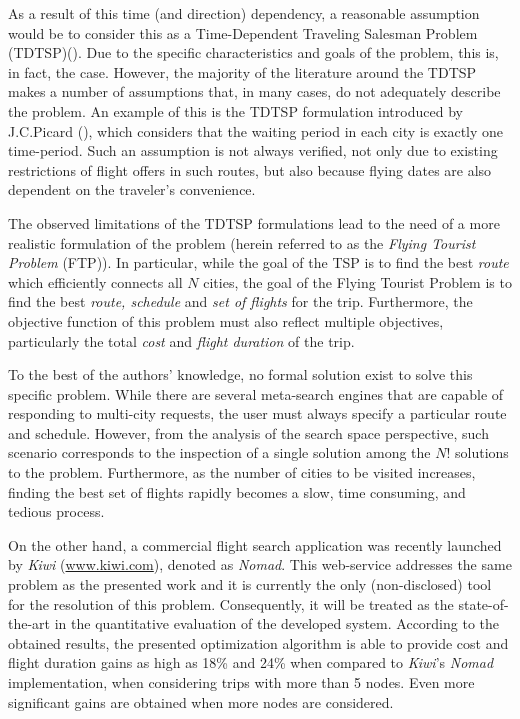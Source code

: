 \documentclass[onecolumn]{elsarticle}
\begin{document}
As a result of this time (and direction) dependency, a reasonable assumption would be to consider this as a Time-Dependent Traveling Salesman Problem (TDTSP)(\cite{tdtsp_fox_2}). Due to the specific characteristics and goals of the problem, this is, in fact, the case. However, the majority of the literature around the TDTSP makes a number of assumptions that, in many cases, do not adequately describe the problem. An example of this is the TDTSP formulation introduced by J.C.Picard (\cite{tdtsp_picard}), which considers that the waiting period in each city is exactly one time-period. Such an assumption is not always verified, not only due to existing restrictions of flight offers in such routes, but also because flying dates are also dependent on the traveler's convenience.

The observed limitations of the TDTSP formulations lead to the need of a more realistic formulation of the problem (herein referred to as the \textit{Flying Tourist Problem} (FTP)). In particular, while the goal of the TSP is to find the best \textit{route} which efficiently connects all $N$ cities, the goal of the Flying Tourist Problem is to find the best \textit{route, schedule} and \textit{set of flights} for the trip. Furthermore, the objective function of this problem must also reflect multiple objectives, particularly the total \textit{cost} and \textit{flight duration} of the trip.

To the best of the authors' knowledge, no formal solution exist to solve this specific problem. While there are several meta-search engines that are capable of responding to multi-city requests, the user must always specify a particular route and schedule. However, from the analysis of the search space perspective, such scenario corresponds to the inspection of a single solution among the $N!$ solutions to the problem. Furthermore, as the number of cities to be visited increases, finding the best set of flights rapidly becomes a slow, time consuming, and tedious process.

On the other hand, a commercial flight search application was recently launched by \textit{Kiwi} (\url{www.kiwi.com}), denoted as \textit{Nomad}. This web-service addresses the same problem as the presented work and it is currently the only (non-disclosed) tool for the resolution of this problem. Consequently, it will be treated as the state-of-the-art in the quantitative evaluation of the developed system. According to the obtained results, the presented optimization algorithm is able to provide cost and flight duration gains as high as 18\% and 24\% when compared to \textit{Kiwi}'s \textit{Nomad} implementation, when considering trips with more than 5 nodes. Even more significant gains are obtained when more nodes are considered.
\end{document}
